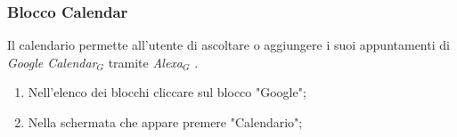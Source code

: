 \subsubsection{Blocco Calendar}
Il calendario permette all'utente di ascoltare o aggiungere i suoi appuntamenti di \textit{Google Calendar$_{G}$}  tramite \textit{Alexa$_{G}$} .
\begin{enumerate}
	\item Nell'elenco dei blocchi cliccare sul blocco "Google";
	\item Nella schermata che appare premere "Calendario";
	\begin{figure}[!ht]
		\centering

\end{figure}
\end{enumerate}

